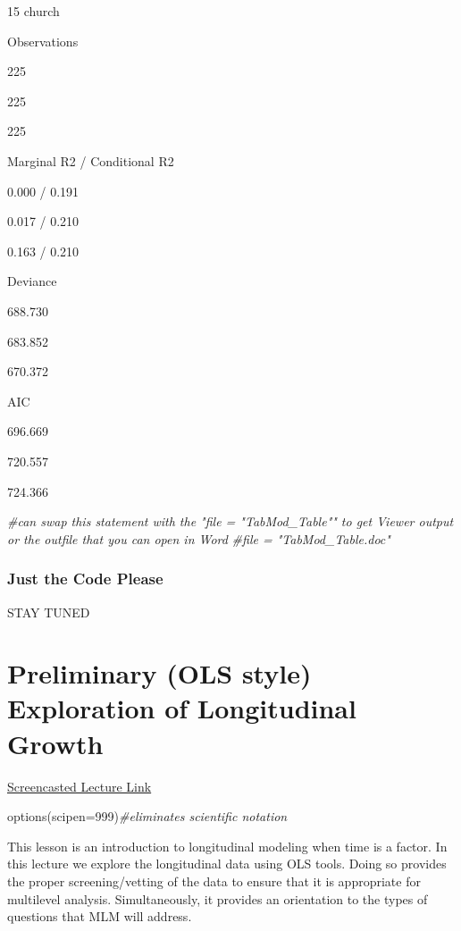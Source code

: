 \documentclass[
  11pt,
]{book}
\newenvironment{Shaded}{\begin{snugshade}}{\end{snugshade}}
\newcommand{\AttributeTok}[1]{\textcolor[rgb]{0.77,0.63,0.00}{#1}}
\newcommand{\CommentTok}[1]{\textcolor[rgb]{0.56,0.35,0.01}{\textit{#1}}}
\newcommand{\DecValTok}[1]{\textcolor[rgb]{0.00,0.00,0.81}{#1}}
\newcommand{\FunctionTok}[1]{\textcolor[rgb]{0.00,0.00,0.00}{#1}}
\newcommand{\NormalTok}[1]{#1}
\begin{document}
15 church

Observations

225

225

225

Marginal R2 / Conditional R2

0.000 / 0.191

0.017 / 0.210

0.163 / 0.210

Deviance

688.730

683.852

670.372

AIC

696.669

720.557

724.366

\begin{Shaded}
\begin{Highlighting}[]
\CommentTok{\#can swap this statement with the "file = "TabMod\_Table"" to get Viewer output or the outfile that you can open in Word}
\CommentTok{\#file = "TabMod\_Table.doc"}
\end{Highlighting}
\end{Shaded}

\hypertarget{just-the-code-please}{%
\subsection{Just the Code Please}\label{just-the-code-please}}

STAY TUNED

\hypertarget{MLMexplore}{%
\chapter{Preliminary (OLS style) Exploration of Longitudinal Growth}\label{MLMexplore}}

\href{https://spu.hosted.panopto.com/Panopto/Pages/Viewer.aspx?pid=36075f1d-b805-40b9-92da-ad2b0053f46c}{Screencasted Lecture Link}

\begin{Shaded}
\begin{Highlighting}[]
\FunctionTok{options}\NormalTok{(}\AttributeTok{scipen=}\DecValTok{999}\NormalTok{)}\CommentTok{\#eliminates scientific notation}
\end{Highlighting}
\end{Shaded}

This lesson is an introduction to longitudinal modeling when time is a factor. In this lecture we explore the longitudinal data using OLS tools. Doing so provides the proper screening/vetting of the data to ensure that it is appropriate for multilevel analysis. Simultaneously, it provides an orientation to the types of questions that MLM will address.
\end{document}
